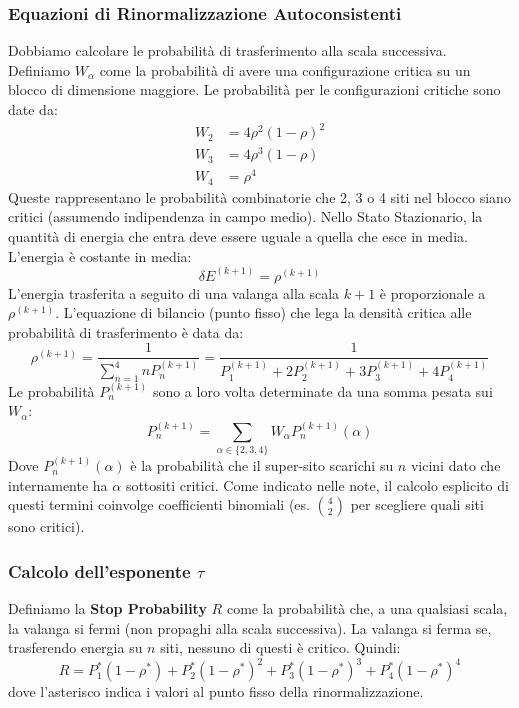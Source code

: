 \subsubsection{Equazioni di Rinormalizzazione Autoconsistenti}
Dobbiamo calcolare le probabilità di trasferimento alla scala successiva. Definiamo $W_\alpha$ come la probabilità di avere una configurazione critica su un blocco di dimensione maggiore. Le probabilità per le configurazioni critiche sono date da:
\begin{align}
    W_2 &= 4\rho^2(1-\rho)^2 \\
    W_3 &= 4\rho^3(1-\rho) \\
    W_4 &= \rho^4
\end{align}
Queste rappresentano le probabilità combinatorie che 2, 3 o 4 siti nel blocco siano critici (assumendo indipendenza in campo medio). Nello Stato Stazionario, la quantità di energia che entra deve essere uguale a quella che esce in media. L'energia è costante in media:
\begin{equation}
    \delta E^{(k+1)} = \rho^{(k+1)}
\end{equation}
L'energia trasferita a seguito di una valanga alla scala $k+1$ è proporzionale a $\rho^{(k+1)}$.
L'equazione di bilancio (punto fisso) che lega la densità critica alle probabilità di trasferimento è data da:
\begin{equation}
    \rho^{(k+1)} = \frac{1}{\sum_{n=1}^4 n P_n^{(k+1)}} = \frac{1}{P_1^{(k+1)} + 2P_2^{(k+1)} + 3P_3^{(k+1)} + 4P_4^{(k+1)}}
\end{equation}
Le probabilità $P_n^{(k+1)}$ sono a loro volta determinate da una somma pesata sui $W_\alpha$:
\begin{equation}
    P_n^{(k+1)} = \sum_{\alpha \in \{2,3,4\}} W_\alpha P_n^{(k+1)}(\alpha)
\end{equation}
Dove $P_n^{(k+1)}(\alpha)$ è la probabilità che il super-sito scarichi su $n$ vicini dato che internamente ha $\alpha$ sottositi critici.
Come indicato nelle note, il calcolo esplicito di questi termini coinvolge coefficienti binomiali (es. $\binom{4}{2}$ per scegliere quali siti sono critici).

\subsubsection{Calcolo dell'esponente $\tau$}
Definiamo la \textbf{Stop Probability} $R$ come la probabilità che, a una qualsiasi scala, la valanga si fermi (non propaghi alla scala successiva).
La valanga si ferma se, trasferendo energia su $n$ siti, nessuno di questi è critico. Quindi:
\begin{equation}
    R = P_1^* (1 - \rho^*) + P_2^* (1 - \rho^*)^2 + P_3^* (1 - \rho^*)^3 + P_4^* (1 - \rho^*)^4
\end{equation}
dove l'asterisco indica i valori al punto fisso della rinormalizzazione.

